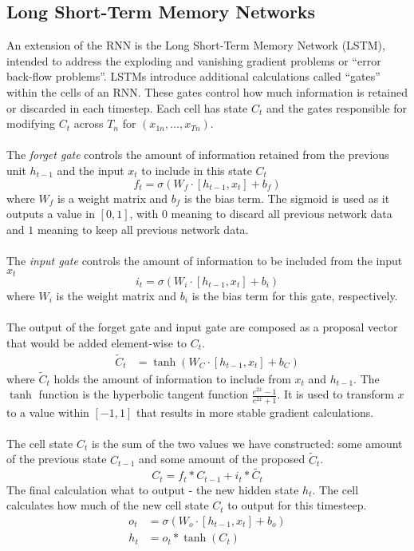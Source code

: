\subsection{Long Short-Term Memory Networks}
An extension of the RNN is the Long Short-Term Memory Network (LSTM), intended 
to address the exploding and vanishing gradient problems or ``error back-flow 
problems''\cite{HocSch:97}. LSTMs introduce additional calculations called ``gates'' 
within the cells of an RNN. These gates control how much information is retained or
discarded in each timestep. Each cell has state $C_t$ and the gates responsible for
modifying $C_t$ across $T_n$ for $(x_{1n}, \ldots, x_{Tn})$.
\\\\
The \textit{forget gate} controls the amount of information retained from the previous
unit $h_{t-1}$ and the input $x_t$ to include in this state $C_t$
\begin{equation}
    f_t = \sigma (W_f \cdot [h_{t-1}, x_t] + b_f)
\end{equation} where $W_f$ is a weight matrix and $b_f$ is the bias term. The sigmoid
is used as it outputs a value in $[0, 1]$, with $0$ meaning to discard all previous 
network data and $1$ meaning to keep all previous network data.
\\\\
The \textit{input gate} controls the amount of information to be included from the input
$x_t$ 
\begin{equation}
    i_t = \sigma (W_i \cdot [h_{t-1}, x_t] + b_i) 
\end{equation} where $W_i$ is the weight matrix and $b_i$ is the bias term for this gate,
respectively.
\\\\
The output of the forget gate and input gate are composed as a proposal vector
that would be added element-wise to $C_t$. 
\begin{align}
    \widetilde{C}_t &= \tanh{(W_C \cdot [h_{t-1}, x_t] + b_C)}
\end{align} where $\widetilde{C}_t$ holds the amount of information to include from 
$x_t$ and $h_{t-1}$. The $\tanh$ function is the hyperbolic tangent function 
$\frac{e^{2x} - 1}{e^{2x} + 1}$. It is used to transform $x$ to a value within 
$[-1, 1]$ that results in more stable gradient calculations.
\\\\
The cell state $C_t$ is the sum of the two values we have constructed: some amount of 
the previous state $C_{t-1}$ and some amount of the proposed $\widetilde{C}_t$.
\begin{equation}
    C_t = f_t * C_{t-1} + i_t * \widetilde{C_t}
\end{equation}
The final calculation what to output - the new hidden state $h_t$. The cell calculates 
how much of the new cell state $C_t$ to output for this timesteep.
\begin{align}
    o_t &= \sigma (W_o \cdot [h_{t-1}, x_t] + b_o) \\
    h_t &= o_t * \tanh(C_t)
\end{align} 

